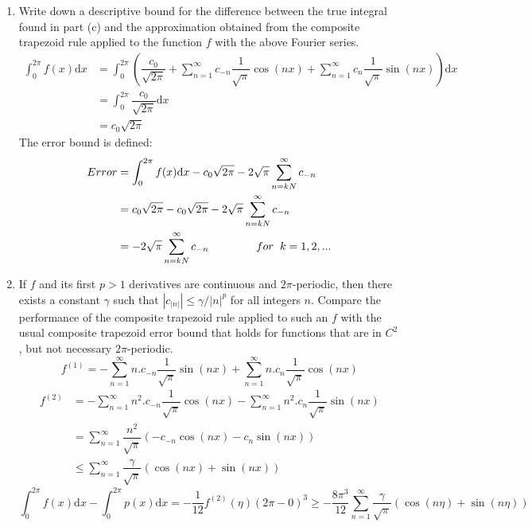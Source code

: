 \documentclass[14pt,a4paper]{article}
\begin{document}
\begin{enumerate}
	\label{2d}
	\item Write down a descriptive bound for the difference between the true integral found in part (c) and the approximation obtained from the composite trapezoid rule applied to the function $f$ with the above Fourier series. 
	\begin{align*} \int_{0}^{2\pi} f(x)\mathrm{d}x &= \int_{0}^{2\pi} \left( \dfrac{c_0}{\sqrt{2\pi}} + \sum_{n=1}^{\infty} c_{-n} \dfrac{1}{\sqrt{\pi}}\cos(nx) + \sum_{n=1}^{\infty} c_n \dfrac{1}{\sqrt{\pi}}\sin(nx) \right) \mathrm{d}x \\
	&= \int_{0}^{2\pi} \dfrac{c_0}{\sqrt{2\pi}}\mathrm{d}x \\
	&= c_0\sqrt{2\pi}
	\end{align*}
	The error bound is defined:
	\begin{align*} Error &= \int_{0}^{2\pi} f(x)\mathrm{d}x - c_0\sqrt{2\pi} - 2\sqrt{\pi} \sum_{n=kN}^{\infty}c_{-n} \\
	&= c_0\sqrt{2\pi} - c_0\sqrt{2\pi} - 2\sqrt{\pi} \sum_{n=kN}^{\infty}c_{-n} \\
	&= - 2\sqrt{\pi} \sum_{n=kN}^{\infty}c_{-n} \hspace{1.5cm} for \hspace{0.2cm} k = 1,2,... \end{align*}
	
	\label{2e}
	\item If $f$ and its first $p > 1$ derivatives are continuous and $2\pi$-periodic, then there exists a constant $\gamma$ such that $|c_{|n|}| \leq \gamma/|n|^p$ for all integers $n$. Compare the performance of the composite trapezoid rule applied to such an $f$ with the usual composite trapezoid error bound that holds for functions that are in $C^2$, but not necessary  $2\pi$-periodic.
	$$ f^{(1)} = -\sum_{n=1}^{\infty} n.c_{-n} \dfrac{1}{\sqrt{\pi}}\sin(nx) + \sum_{n=1}^{\infty} n.c_n \dfrac{1}{\sqrt{\pi}}\cos(nx)$$
	\begin{align*} f^{(2)} &= -\sum_{n=1}^{\infty} n^2.c_{-n} \dfrac{1}{\sqrt{\pi}}\cos(nx) - \sum_{n=1}^{\infty} n^2.c_n \dfrac{1}{\sqrt{\pi}}\sin(nx) \\
	&= \sum_{n=1}^{\infty} \dfrac{n^2}{\sqrt{\pi}} \left(-c_{-n}\cos(nx) - c_n\sin(nx)\right)\\
	&\leq \sum_{n=1}^{\infty} \dfrac{\gamma}{\sqrt{\pi}} \left(\cos(nx) + \sin(nx)\right)  \end{align*}
	$$ \int_{0}^{2\pi} f(x)\mathrm{d}x - \int_{0}^{2\pi} p(x)\mathrm{d}x =  -\dfrac{1}{12}f^{(2)}(\eta)(2\pi-0)^3 %
	\geq -\dfrac{8\pi^3}{12}\sum_{n=1}^{\infty} \dfrac{\gamma}{\sqrt{\pi}} \left(\cos(n\eta) + \sin(n\eta)\right)  
	$$ %
	

\end{enumerate}
\end{document}
